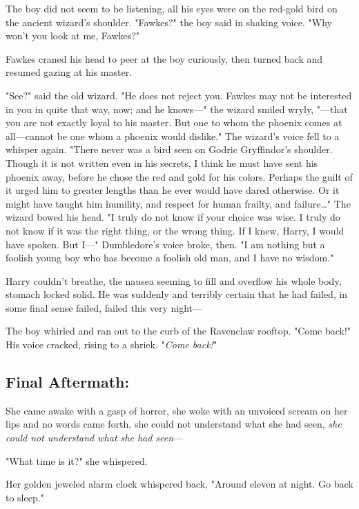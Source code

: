 The boy did not seem to be listening, all his eyes were on the red-gold bird on
the ancient wizard's shoulder. "Fawkes?" the boy said in shaking voice. "Why
won't you look at me, Fawkes?"

Fawkes craned his head to peer at the boy curiously, then turned back and
resumed gazing at his master.

"See?" said the old wizard. "He does not reject you. Fawkes may not be
interested in you in quite that way, now; and he knows---" the wizard smiled
wryly, "---that you are not exactly loyal to his master. But one to whom the
phoenix comes at all---cannot be one whom a phoenix would dislike." The
wizard's voice fell to a whisper again. "There never was a bird seen on Godric
Gryffindor's shoulder. Though it is not written even in his secrets, I think he
must have sent his phoenix away, before he chose the red and gold for his
colors. Perhaps the guilt of it urged him to greater lengths than he ever would
have dared otherwise. Or it might have taught him humility, and respect for
human frailty, and failure{\ldots}" The wizard bowed his head. "I truly do not
know if your choice was wise. I truly do not know if it was the right thing, or
the wrong thing. If I knew, Harry, I would have spoken. But I---" Dumbledore's
voice broke, then. "I am nothing but a foolish young boy who has become a
foolish old man, and I have no wisdom."

Harry couldn't breathe, the nausea seeming to fill and overflow his whole body,
stomach locked solid. He was suddenly and terribly certain that he had failed,
in some final sense failed, failed this very night---

The boy whirled and ran out to the curb of the Ravenclaw rooftop. "Come back!"
His voice cracked, rising to a shriek. "\emph{Come back!}"
\sbreak
\vspace{-2\baselineskip}
\subsection{Final Aftermath:}

She came awake with a gasp of horror, she woke with an unvoiced scream on her
lips and no words came forth, she could not understand what she had seen,
\emph{she could not understand what she had seen}---

"What time is it?" she whispered.

Her golden jeweled alarm clock whispered back, "Around eleven at night. Go back
to sleep."

